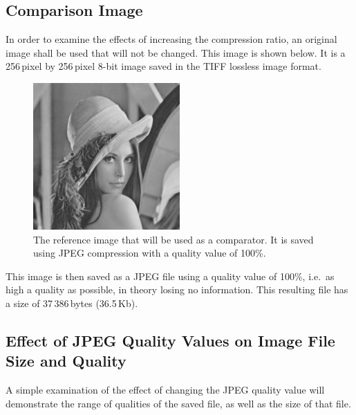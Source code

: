 	\subsection{Comparison Image} %
		\label{sub:comparison_image}
		In order to examine the effects of increasing the compression ratio, an original image shall be used that will not be changed. This image is shown below. It is a 256\,pixel by 256\,pixel 8-bit image saved in the TIFF lossless image format.
		\begin{figure}[ht]
		 	\centering
		 	\includegraphics[width=0.5\textwidth]{lena.jpg}
			\caption{The reference image that will be used as a comparator. It is saved using JPEG compression with a quality value of 100\%.\label{fig:orig}}
		\end{figure}
		This image is then saved as a JPEG file using a quality value of 100\%, i.e.\ as high a quality as possible, in theory losing no information. This resulting file has a size of 37\,386\,bytes (36.5\,Kb).

	\subsection{Effect of JPEG Quality Values on Image File Size and Quality} %
		\label{sub:effect_of_jpeg_quality_values_on_image_file_size_and_quality}
		A simple examination of the effect of changing the JPEG quality value will demonstrate the range of qualities of the saved file, as well as the size of that file.

